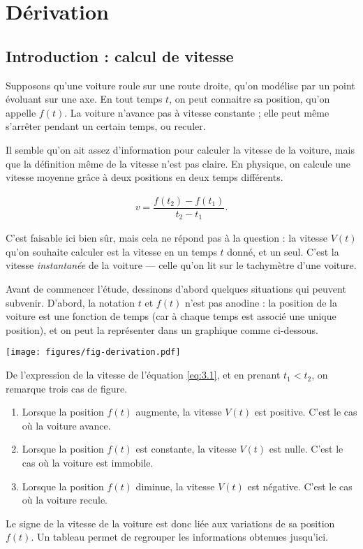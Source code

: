 
\chapter{Dérivation}

\section{Introduction : calcul de vitesse}

Supposons qu'une voiture roule sur une route droite, qu'on modélise par un point évoluant sur une axe.
En tout temps $t$, on peut connaitre sa position, qu'on appelle $f(t)$.
La voiture n'avance pas à vitesse constante ;
elle peut même s'arrêter pendant un certain temps, ou reculer.


Il semble qu'on ait assez d'information pour calculer la vitesse de la voiture, mais que la définition même de la vitesse n'est pas claire.
En physique, on calcule une vitesse moyenne grâce à deux positions en deux temps différents.

	\begin{align}
		v = \dfrac{f(t_2) - f(t_1)}{t_2-t_1}. \label{eq:3.1}
	\end{align}

C'est faisable ici bien sûr, mais cela ne répond pas à la question : la vitesse $V(t)$ qu'on souhaite calculer est la vitesse en un temps $t$ donné, et un seul.
C'est la vitesse \emph{instantanée} de la voiture --- celle qu'on lit sur le tachymètre d'une voiture.


Avant de commencer l'étude, dessinons d'abord quelques situations qui peuvent subvenir.
D'abord, la notation $t$ et $f(t)$ n'est pas anodine : la position de la voiture est une fonction de temps (car à chaque temps est associé une unique position), et on peut la représenter dans un graphique comme ci-dessous.
\begin{center}
\texttt{[image: figures/fig-derivation.pdf]}
\end{center}

De l'expression de la vitesse de l'équation \eqref{eq:3.1}, et en prenant $t_1 < t_2$, on remarque trois cas de figure.
\begin{enumerate}
	\item Lorsque la position $f(t)$ augmente, la vitesse $V(t)$ est positive. 
	C'est le cas où la voiture avance.
	\item Lorsque la position $f(t)$ est constante, la vitesse $V(t)$ est nulle.
	C'est le cas où la voiture est immobile. 
	\item Lorsque la position $f(t)$ diminue, la vitesse $V(t)$ est négative.
	C'est le cas où la voiture recule.
\end{enumerate}
Le signe de la vitesse de la voiture est donc liée aux variations de sa position $f(t)$.
Un tableau permet de regrouper les informations obtenues jusqu'ici.
	
